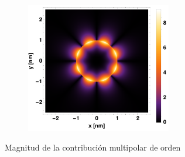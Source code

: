 \documentclass[a4paper,10pt]{article}
\begin{document}
\begin{figure}[htb!]
\begin{subfigure}[b]{0.5\textwidth}
\caption{}
\end{subfigure}
\begin{subfigure}[b]{0.5\textwidth}
\includegraphics[width=180pt]{MH4(Mar).pdf}
\caption{}
\end{subfigure}
\caption{Magnitud de la contribución multipolar de orden }
\end{figure}
\end{document}
